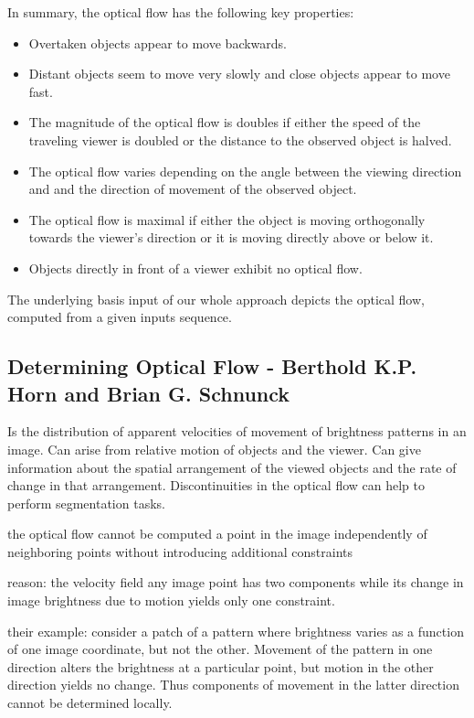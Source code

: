 In summary, the optical flow has the following key properties:
\begin{itemize}
  \item Overtaken objects appear to move backwards.
  \item Distant objects seem to move very slowly and close objects appear to move fast.
  \item The magnitude of the optical flow is doubles if either the speed of the traveling viewer is doubled or the distance to the observed object is halved.
  \item The optical flow varies depending on the angle between the viewing direction and and the direction of movement of the observed object.
  \item The optical flow is maximal if either the object is moving orthogonally towards the viewer's direction or it is moving directly above or below it.
  \item Objects directly in front of a viewer exhibit no optical flow.
\end{itemize}
The underlying basis input of our whole approach depicts the optical flow, computed from a given inputs sequence.

\subsection{Determining Optical Flow - Berthold K.P. Horn and Brian G. Schnunck}

Is the distribution of apparent velocities of movement of brightness patterns in an image.
Can arise from relative motion of objects and the viewer.
Can give information about the spatial arrangement of the viewed objects and the rate of change in that arrangement.
Discontinuities in the optical flow can help to perform segmentation tasks.

the optical flow cannot be computed a point in the image independently of neighboring points without introducing additional constraints

reason: the velocity field any image point has two components while its change in image brightness due to motion yields only one constraint.

their example: consider a patch of a pattern where brightness varies as a function of one image coordinate, but not the other. Movement of the pattern in one direction alters the brightness at a particular point, but motion in the other direction yields no change. Thus components of movement in the latter direction cannot be determined locally.

